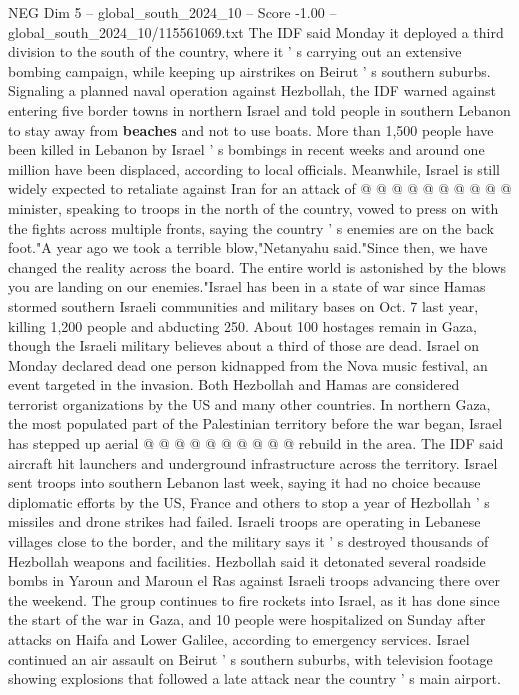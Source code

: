 \begin{textsample}{NEG Dim 5 – global\_south\_2024\_10 – Score -1.00 – global\_south\_2024\_10/115561069.txt}
The IDF said Monday it deployed a third division to the south of the country, where it ' s carrying out an extensive bombing campaign, while keeping up airstrikes on Beirut ' s southern suburbs.
Signaling a planned naval operation against Hezbollah, the IDF warned against entering five border towns in northern Israel and told people in southern Lebanon to stay away from \textbf{beaches} and not to use boats.
More than 1,500 people have been killed in Lebanon by Israel ' s bombings in recent weeks and around one million have been displaced, according to local officials.
Meanwhile, Israel is still widely expected to retaliate against Iran for an attack of @ @ @ @ @ @ @ @ @ @ minister, speaking to troops in the north of the country, vowed to press on with the fights across multiple fronts, saying the country ' s enemies are on the back foot."A year ago we took a terrible blow,"Netanyahu said."Since then, we have changed the reality across the board.
The entire world is astonished by the blows you are landing on our enemies."Israel has been in a state of war since Hamas stormed southern Israeli communities and military bases on Oct. 7 last year, killing 1,200 people and abducting 250.
About 100 hostages remain in Gaza, though the Israeli military believes about a third of those are dead.
Israel on Monday declared dead one person kidnapped from the Nova music festival, an event targeted in the invasion.
Both Hezbollah and Hamas are considered terrorist organizations by the US and many other countries.
In northern Gaza, the most populated part of the Palestinian territory before the war began, Israel has stepped up aerial @ @ @ @ @ @ @ @ @ @ rebuild in the area.
The IDF said aircraft hit launchers and underground infrastructure across the territory.
Israel sent troops into southern Lebanon last week, saying it had no choice because diplomatic efforts by the US, France and others to stop a year of Hezbollah ' s missiles and drone strikes had failed.
Israeli troops are operating in Lebanese villages close to the border, and the military says it ' s destroyed thousands of Hezbollah weapons and facilities.
Hezbollah said it detonated several roadside bombs in Yaroun and Maroun el Ras against Israeli troops advancing there over the weekend.
The group continues to fire rockets into Israel, as it has done since the start of the war in Gaza, and 10 people were hospitalized on Sunday after attacks on Haifa and Lower Galilee, according to emergency services.
Israel continued an air assault on Beirut ' s southern suburbs, with television footage showing explosions that followed a late attack near the country ' s main airport.

\end{textsample}
